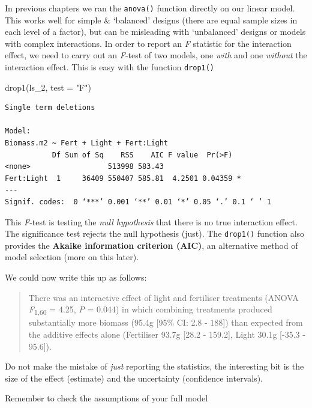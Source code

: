 \documentclass[
]{book}
\makeatletter
\newenvironment{Shaded}{\begin{snugshade}}{\end{snugshade}}
\newcommand{\AttributeTok}[1]{\textcolor[rgb]{0.77,0.63,0.00}{#1}}
\newcommand{\FunctionTok}[1]{\textcolor[rgb]{0.00,0.00,0.00}{#1}}
\newcommand{\NormalTok}[1]{#1}
\newcommand{\StringTok}[1]{\textcolor[rgb]{0.31,0.60,0.02}{#1}}
\newenvironment{kframe}{%
\medskip{}
\setlength{\fboxsep}{.8em}
 \def\at@end@of@kframe{}%
 \ifinner\ifhmode%
  \def\at@end@of@kframe{\end{minipage}}%
  \begin{minipage}{\columnwidth}%
 \fi\fi%
 \def\FrameCommand##1{\hskip\@totalleftmargin \hskip-\fboxsep
 \colorbox{shadecolor}{##1}\hskip-\fboxsep
     \hskip-\linewidth \hskip-\@totalleftmargin \hskip\columnwidth}%
 \MakeFramed {\advance\hsize-\width
   \@totalleftmargin\z@ \linewidth\hsize
   \@setminipage}}%
 {\par\unskip\endMakeFramed%
 \at@end@of@kframe}
\newenvironment{block}[1]
  {
  \begin{itemize}
  \renewcommand{\labelitemi}{
    \raisebox{-.7\height}[0pt][0pt]{
      {\setkeys{Gin}{width=3em,keepaspectratio}\texttt{[image: images/\#1]}}
    }
  }
  \setlength{\fboxsep}{1em}
  \begin{kframe}
  \item
  }
  {
  \end{kframe}
  \end{itemize}
  }
\newenvironment{rmdwarning}
  {\begin{block}{warning}}
  {\end{block}}
\makeatother
\begin{document}
In previous chapters we ran the \texttt{anova()} function directly on our linear model. This works well for simple \& `balanced' designs (there are equal sample sizes in each level of a factor), but can be misleading with `unbalanced' designs or models with complex interactions.
In order to report an \emph{F} statistic for the interaction effect, we need to carry out an \emph{F}-test of two models, one \emph{with} and one \emph{without} the interaction effect. This is easy with the function \texttt{drop1()}

\begin{Shaded}
\begin{Highlighting}[]
\FunctionTok{drop1}\NormalTok{(ls\_2, }\AttributeTok{test =} \StringTok{"F"}\NormalTok{)}
\end{Highlighting}
\end{Shaded}

\begin{verbatim}
Single term deletions

Model:
Biomass.m2 ~ Fert + Light + Fert:Light
           Df Sum of Sq    RSS    AIC F value  Pr(>F)  
<none>                  513998 583.43                  
Fert:Light  1     36409 550407 585.81  4.2501 0.04359 *
---
Signif. codes:  0 ‘***’ 0.001 ‘**’ 0.01 ‘*’ 0.05 ‘.’ 0.1 ‘ ’ 1
\end{verbatim}

This \emph{F}-test is testing the \emph{null hypothesis} that there is no true interaction effect. The significance test rejects the null hypothesis (just). The \texttt{drop1()} function also provides the \textbf{Akaike information criterion (AIC)}, an alternative method of model selection (more on this later).

We could now write this up as follows:

\begin{quote}
There was an interactive effect of light and fertiliser treatments (ANOVA \emph{F}\textsubscript{1,60} = 4.25, \emph{P} = 0.044) in which combining treatments produced substantially more biomass (95.4g {[}95\% CI: 2.8 - 188{]}) than expected from the additive effects alone (Fertiliser 93.7g {[}28.2 - 159.2{]}, Light 30.1g {[}-35.3 - 95.6{]}).
\end{quote}

Do not make the mistake of \emph{just} reporting the statistics, the interesting bit is the size of the effect (estimate) and the uncertainty (confidence intervals).

\begin{rmdwarning}
Remember to check the assumptions of your full model
\end{rmdwarning}
\end{document}
